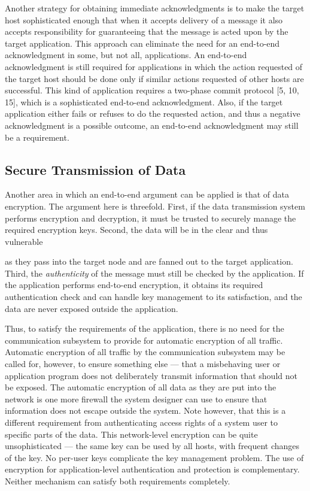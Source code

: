 \documentclass[a4paper,11pt,notitlepage,twoside,openright]{article}
\begin{document}
Another strategy for obtaining immediate acknowledgments is to make the
target host sophisticated enough that when it accepts delivery of a
message it also accepts responsibility for guaranteeing that the message
is acted upon by the target application. This approach can eliminate the
need for an end-to-end acknowledgment in some, but not all,
applications. An end-to-end acknowledgment is still required for
applications in which the action requested of the target host should be
done only if similar actions requested of other hosts are successful.
This kind of application requires a two-phase commit protocol {[}5, 10,
15{]}, which is a sophisticated end-to-end acknowledgment. Also, if the
target application either fails or refuses to do the requested action,
and thus a negative acknowledgment is a possible outcome, an end-to-end
acknowledgment may still be a requirement.

\hypertarget{secure-transmission-of-data}{%
\subsection{Secure Transmission of
Data}\label{secure-transmission-of-data}}

Another area in which an end-to-end argument can be applied is that of
data encryption. The argument here is threefold. First, if the data
transmission system performs encryption and decryption, it must be
trusted to securely manage the required encryption keys. Second, the
data will be in the clear and thus vulnerable

as they pass into the target node and are fanned out to the target
application. Third, the \emph{authenticity} of the message must still be
checked by the application. If the application performs end-to-end
encryption, it obtains its required authentication check and can handle
key management to its satisfaction, and the data are never exposed
outside the application.

Thus, to satisfy the requirements of the application, there is no need
for the communication subsystem to provide for automatic encryption of
all traffic. Automatic encryption of all traffic by the communication
subsystem may be called for, however, to ensure something else --- that a misbehaving user or application program does not deliberately
transmit information that should not be exposed. The automatic
encryption of all data as they are put into the network is one more
firewall the system designer can use to ensure that information does not
escape outside the system. Note however, that this is a different
requirement from authenticating access rights of a system user to
specific parts of the data. This network-level encryption can be quite
unsophisticated --- the same key can be used by all hosts, with
frequent changes of the key. No per-user keys complicate the key
management problem. The use of encryption for application-level
authentication and protection is complementary. Neither mechanism can
satisfy both requirements completely.
\end{document}
